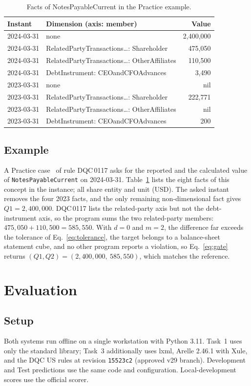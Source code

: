 \documentclass[conference]{IEEEtran}
\newcommand{\DQC}[1]{DQC\,#1}
\newcommand{\QA}{\textit{Q1}}
\newcommand{\QB}{\textit{Q2}}
\begin{document}
\begin{table}[t]
\caption{Facts of NotesPayableCurrent in the Practice example.}
\label{tab:example}
\centering\footnotesize
\setlength{\tabcolsep}{3pt}
\begin{tabular}{@{}llr@{}}
\toprule
Instant & Dimension (axis: member) & Value\\
\midrule
2024-03-31 & none & 2,400,000\\
2024-03-31 & RelatedPartyTransactions\ldots: Shareholder & 475,050\\
2024-03-31 & RelatedPartyTransactions\ldots: OtherAffiliates & 110,500\\
2024-03-31 & DebtInstrument: CEOandCFOAdvances & 3,490\\
2023-03-31 & none & nil\\
2023-03-31 & RelatedPartyTransactions\ldots: Shareholder & 222,771\\
2023-03-31 & RelatedPartyTransactions\ldots: OtherAffiliates & nil\\
2023-03-31 & DebtInstrument: CEOandCFOAdvances & 200\\
\bottomrule
\end{tabular}
\end{table}

\subsection{Example}
A Practice case~\cite{finreason2026task3overview,wang2026finauditing} of rule \DQC{0117} asks for the reported and the calculated value of \texttt{NotesPayableCurrent} on 2024-03-31. Table~\ref{tab:example} lists the eight facts of this concept in the instance; all share entity and unit (USD). The asked instant removes the four 2023 facts, and the only remaining non-dimensional fact gives $\QA{}=2{,}400{,}000$. \DQC{0117} lists the related-party axis but not the debt-instrument axis, so the program sums the two related-party members: $475{,}050+110{,}500=585{,}550$. With $d=0$ and $m=2$, the difference far exceeds the tolerance of Eq.~\eqref{eq:tolerance}, the target belongs to a balance-sheet statement cube, and no other program reports a violation, so Eq.~\eqref{eq:gate} returns $(\QA{},\QB{})=(2{,}400{,}000,\ 585{,}550)$, which matches the reference.

\section{Evaluation}
\subsection{Setup}
Both systems run offline on a single workstation with Python 3.11. Task~1 uses only the standard library; Task~3 additionally uses lxml, Arelle 2.46.1 with Xule, and the DQC US rules at revision \texttt{15523c2} (approved v29 branch). Development and Test predictions use the same code and configuration. Local-development scores use the official scorer.
\end{document}
